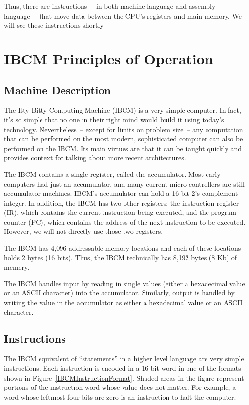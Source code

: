 Thus, there are instructions~-- in both machine language and assembly
language~-- that move data between the CPU's registers and main memory.
We will see these instructions shortly.



\section{IBCM Principles of Operation}

\subsection{Machine Description}

The Itty Bitty Computing Machine (IBCM) is a very simple computer.  In
fact, it's so simple that no one in their right mind would build it
using today's technology. Nevertheless~-- except for limits on problem
size~-- any computation that can be performed on the most modern,
sophisticated computer can also be performed on the IBCM.  Its main
virtues are that it can be taught quickly and provides context for
talking about more recent architectures.

The IBCM contains a single register, called the accumulator.  Most
early computers had just an accumulator, and many current
micro-controllers are still accumulator machines.  IBCM's accumulator
can hold a 16-bit 2's complement integer.  In addition, the IBCM has
two other registers: the instruction register (IR), which contains the
current instruction being executed, and the program counter (PC),
which contains the address of the next instruction to be executed.
However, we will not directly use those two registers.

The IBCM has 4,096 addressable memory locations and each of these
locations holds 2 bytes (16 bits).  Thus, the IBCM technically has
8,192 bytes (8 Kb) of memory.

The IBCM handles input by reading in single values (either a
hexadecimal value or an ASCII character) into the accumulator.
Similarly, output is handled by writing the value in the accumulator
as either a hexadecimal value or an ASCII character.

\subsection{Instructions}

The IBCM equivalent of ``statements'' in a higher level language are
very simple instructions.  Each instruction is encoded in a 16-bit
word in one of the formats shown in
Figure~\ref{IBCMInstructionFormat}.  Shaded areas in the figure
represent portions of the instruction word whose value does not
matter. For example, a word whose leftmost four bits are zero is an
instruction to halt the computer.


